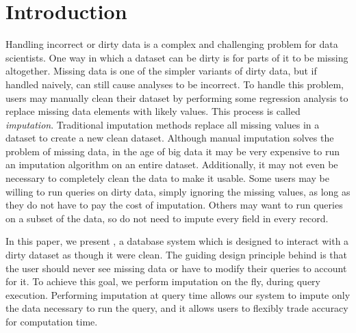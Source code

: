 \section{Introduction}

Handling incorrect or dirty data is a complex and challenging problem for data scientists.
One way in which a dataset can be dirty is for parts of it to be missing altogether.
Missing data is one of the simpler variants of dirty data, but if handled naively, can still cause analyses to be incorrect.
To handle this problem, users may manually clean their dataset by performing some regression analysis to replace missing data elements with likely values.
This process is called \emph{imputation}.
Traditional imputation methods replace all missing values in a dataset to create a new clean dataset.
Although manual imputation solves the problem of missing data, in the age of big data it may be very expensive to run an imputation algorithm on an entire dataset.
Additionally, it may not even be necessary to completely clean the data to make it usable.
Some users may be willing to run queries on dirty data, simply ignoring the missing values, as long as they do not have to pay the cost of imputation.
Others may want to run queries on a subset of the data, so do not need to impute every field in every record.

In this paper, we present \ProjectName{}, a database system which is designed to interact with a dirty dataset as though it were clean.
The guiding design principle behind \ProjectName{} is that the user should never see missing data or have to modify their queries to account for it.
To achieve this goal, we perform imputation on the fly, during query execution.
Performing imputation at query time allows our system to impute only the data necessary to run the query, and it allows users to flexibly trade accuracy for computation time.

